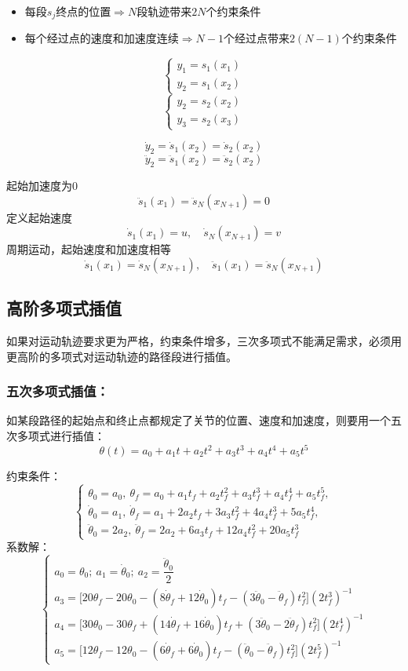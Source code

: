 \begin{itemize}
    \item 每段$s_j$终点的位置$\Longrightarrow$$N$段轨迹带来$2N$个约束条件
    \item 每个经过点的速度和加速度连续$\Longrightarrow$$N-1$个经过点带来$2(N-1)$个约束条件
\end{itemize}

$$
\begin{cases}
    y_1=s_1(x_1) \\
    y_2=s_1(x_2)
\end{cases}
$$
$$
\begin{cases}
    y_2=s_2(x_2) \\
    y_3=s_2(x_3)
\end{cases}
$$

$$
\dot{y}_2 = \dot{s}_1(x_2) = \dot{s}_2(x_2)
$$
$$
\ddot{y}_2 = \ddot{s}_1(x_2) = \ddot{s}_2(x_2)
$$

起始加速度为0
$$
\ddot{s}_1(x_1) = \ddot{s}_N(x_{N+1}) = 0
$$
定义起始速度
$$
\dot{s}_1(x_1) = u,\quad \dot{s}_N(x_{N+1}) = v
$$
周期运动，起始速度和加速度相等
$$
\dot{s}_1(x_1) = \dot{s}_N(x_{N+1}),\quad \ddot{s}_1(x_1) = \ddot{s}_N(x_{N+1})
$$

\subsection{高阶多项式插值}
如果对运动轨迹要求更为严格，约束条件增多，三次多项式不能满足需求，必须用更高阶的多项式对运动轨迹的路径段进行插值。

\subsubsection{五次多项式插值：}
如某段路径的起始点和终止点都规定了关节的位置、速度和加速度，则要用一个五次多项式进行插值：
$$\theta(t) = a_0 + a_1 t + a_2 t^2 + a_3 t^3 + a_4 t^4 + a_5 t^5$$

约束条件：
$$\begin{cases}
\theta_0 = a_0,\ \theta_f = a_0 + a_1 t_f + a_2 t_f^2 + a_3 t_f^3 + a_4 t_f^4 + a_5 t_f^5, \\
\dot{\theta}_0 = a_1,\ \dot{\theta}_f = a_1 + 2a_2 t_f + 3a_3 t_f^2 + 4a_4 t_f^3 + 5a_5 t_f^4, \\
\ddot{\theta}_0 = 2a_2,\ \ddot{\theta}_f = 2a_2 + 6a_3 t_f + 12a_4 t_f^2 + 20a_5 t_f^3
\end{cases}$$
系数解：
$$\begin{cases}
a_0 = \theta_0;\ a_1 = \dot{\theta}_0;\ a_2 = \dfrac{\ddot{\theta}_0}{2} \\
a_3 = \big[20\theta_f - 20\theta_0 - (8\dot{\theta}_f + 12\dot{\theta}_0)t_f - (3\ddot{\theta}_0 - \ddot{\theta}_f)t_f^2\big](2t_f^3)^{-1} \\
a_4 = \big[30\theta_0 - 30\theta_f + (14\dot{\theta}_f + 16\dot{\theta}_0)t_f + (3\ddot{\theta}_0 - 2\ddot{\theta}_f)t_f^2\big](2t_f^4)^{-1} \\
a_5 = \big[12\theta_f - 12\theta_0 - (6\dot{\theta}_f + 6\dot{\theta}_0)t_f - (\ddot{\theta}_0 - \ddot{\theta}_f)t_f^2\big](2t_f^5)^{-1}
\end{cases}$$

